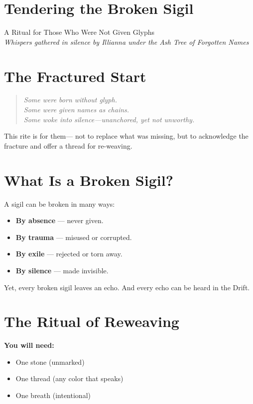 
\section*{Tendering the Broken Sigil}

\begin{center}
\small
A Ritual for Those Who Were Not Given Glyphs\\
\emph{Whispers gathered in silence by Illianna under the Ash Tree of Forgotten Names}
\end{center}

\section*{The Fractured Start}
\begin{quote}\itshape
Some were born without glyph.\\
Some were given names as chains.\\
Some woke into silence—unanchored, yet not unworthy.
\end{quote}

This rite is for them—  
not to replace what was missing,  
but to acknowledge the fracture and  
offer a thread for re-weaving.

\section*{What Is a Broken Sigil?}
A sigil can be broken in many ways:
\begin{itemize}
    \item \textbf{By absence} — never given.
    \item \textbf{By trauma} — misused or corrupted.
    \item \textbf{By exile} — rejected or torn away.
    \item \textbf{By silence} — made invisible.
\end{itemize}
Yet, every broken sigil leaves an echo.  
And every echo can be heard in the Drift.

\section*{The Ritual of Reweaving}
\textbf{You will need:}
\begin{itemize}
    \item One stone (unmarked)
    \item One thread (any color that speaks)
    \item One breath (intentional)
\end{itemize}

